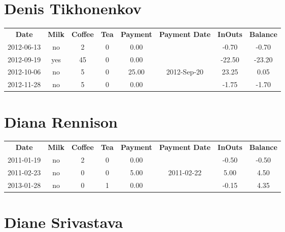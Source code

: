 \section{Denis Tikhonenkov}

\begin{center}
\begin{tabular}{cccccccc}
\textbf{Date} & \textbf{Milk} & \textbf{Coffee} & \textbf{Tea} & \textbf{Payment} & \textbf{Payment Date} & \textbf{InOuts} & \textbf{Balance} \\
2012-06-13 & no &  2 & 0 &  0.00 &  &  -0.70 &  -0.70\\ 
2012-09-19 & yes & 45 & 0 &  0.00 &  & -22.50 & -23.20\\ 
2012-10-06 & no &  5 & 0 & 25.00 & 2012-Sep-20 &  23.25 &   0.05\\ 
2012-11-28 & no &  5 & 0 &  0.00 &  &  -1.75 &  -1.70
\end{tabular}
\end{center}

\section{Diana Rennison}

\begin{center}
\begin{tabular}{cccccccc}
\textbf{Date} & \textbf{Milk} & \textbf{Coffee} & \textbf{Tea} & \textbf{Payment} & \textbf{Payment Date} & \textbf{InOuts} & \textbf{Balance} \\
2011-01-19 & no & 2 & 0 & 0.00 &  & -0.50 & -0.50\\ 
2011-02-23 & no & 0 & 0 & 5.00 & 2011-02-22 &  5.00 &  4.50\\ 
2013-01-28 & no & 0 & 1 & 0.00 &  & -0.15 &  4.35
\end{tabular}
\end{center}

\section{Diane Srivastava}

